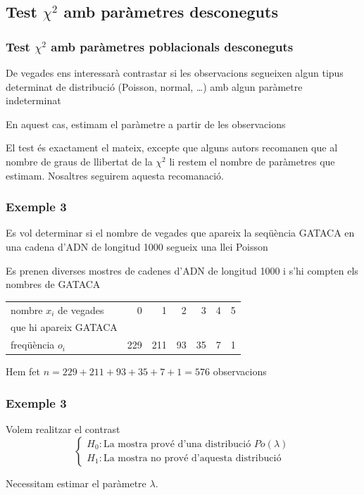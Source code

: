 \documentclass[12pt,t]{beamer}
\theoremstyle{plain}
\theoremstyle{definition}
\begin{document}
\subsection{Test $\chi^2$ amb paràmetres desconeguts}




\begin{frame}
 \frametitle{Test $\chi^2$ amb paràmetres poblacionals desconeguts}

De vegades ens interessarà contrastar si les observacions segueixen algun tipus determinat de distribució (Poisson, normal, \ldots) amb algun paràmetre indeterminat
\medskip

En aquest cas, estimam el paràmetre a partir de les observacions
\medskip

El test és exactament el mateix, excepte que alguns autors recomanen que al nombre de graus de llibertat de la $\chi^2$ li restem el nombre de paràmetres que estimam. Nosaltres seguirem aquesta recomanació.
\end{frame}
 
 
\begin{frame}
\frametitle{Exemple 3}
Es vol determinar si el nombre de vegades que apareix la seqüència GATACA en una
cadena d'ADN de longitud 1000 segueix una llei Poisson
\medskip

Es prenen diverses  mostres de cadenes d'ADN de longitud 1000 i s'hi compten els nombres de GATACA
\begin{center}
\begin{tabular}{|l|rrrrrr|}
\hline
nombre $x_i$ de vegades & 0 & 1 & 2 & 3 & 4 & 5 \\
que hi apareix GATACA & & & & & & \\
\hline
freqüència $o_{i}$ & 229 & 211 & 93 & 35 & 7 & 1 \\
\hline
\end{tabular}
\end{center}
Hem fet $n=229 + 211+ 93+ 35 + 7 + 1=576$ observacions
\end{frame}





\begin{frame}
\frametitle{Exemple 3}

Volem realitzar el contrast
$$
\left\{ \begin {array}{ll}
H_0: \mbox{La mostra prové d'una distribució 
} Po(\lambda)\\
H_1: \mbox{La mostra no prové d'aquesta distribució}
\end{array}
\right.$$

Necessitam estimar el paràmetre $\lambda$.

\end{frame}
\end{document}
